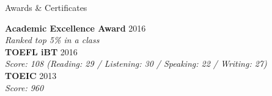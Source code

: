 \documentclass{resume} %
\begin{document}

\begin{rSection}{Awards \& Certificates}

{\bf Academic Excellence Award} \hfill {2016} \\
{\em Ranked top 5\% in a class} \\
{\bf TOEFL iBT} \hfill {2016} \\
{\em Score: 108 (Reading: 29 / Listening: 30 / Speaking: 22 / Writing: 27)} \\
{\bf TOEIC} \hfill {2013} \\
{\em Score: 960}

\end{rSection}





\end{document}
